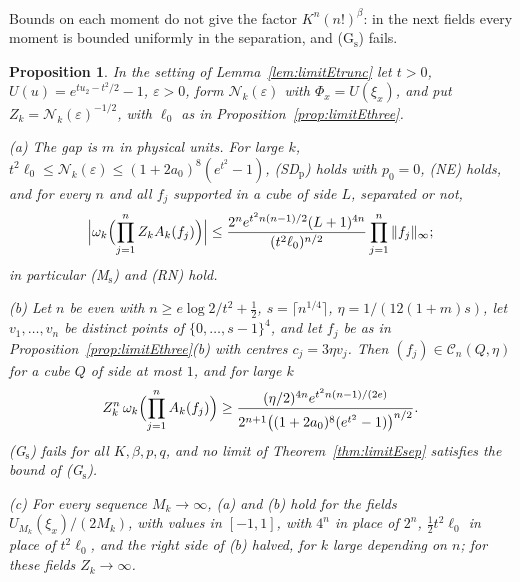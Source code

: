 \documentclass[aps,prd,twocolumn,superscriptaddress,nofootinbib,longbibliography,floatfix,amsmath,amssymb,10pt]{revtex4-2}
\newtheorem{proposition}[theorem]{Proposition}
\theoremstyle{definition}
\theoremstyle{remark}
\begin{document}
Bounds on each moment do not give the factor $K^n(n!)^\beta$: in the next
fields every moment is bounded uniformly in the separation, and
(G$_{\mathrm s}$) fails.

\begin{proposition}\label{prop:limitEfactorial}
In the setting of Lemma~\textup{\ref{lem:limitEtrunc}} let $t>0$,
$U(u)=e^{tu_2-t^2/2}-1$, $\varepsilon>0$, form $\mathcal N_k(\varepsilon)$
with $\Phi_x=U(\xi_x)$, and put $Z_k=\mathcal N_k(\varepsilon)^{-1/2}$, with
$\ell_0$ as in Proposition~\textup{\ref{prop:limitEthree}}.

\textup{(a)} The gap is $m$ in physical units. For large $k$, $t^2\ell_0\le
\mathcal N_k(\varepsilon)\le(1+2a_0)^8(e^{t^2}-1)$, \textup{(SD$_{\mathrm
p}$)} holds with $p_0=0$, \textup{(NE)} holds, and for every $n$ and all
$f_j$ supported in a cube of side $L$, separated or not,
\[
\Bigl|\omega_k\Bigl(\prod_{j=1}^nZ_kA_k(f_j)\Bigr)\Bigr|\le
\frac{2^ne^{t^2n(n-1)/2}(L+1)^{4n}}{(t^2\ell_0)^{n/2}}\prod_{j=1}^n\|f_j\|
_\infty ;
\]
in particular \textup{(M$_{\mathrm s}$)} and \textup{(RN)} hold.

\textup{(b)} Let $n$ be even with $n\ge e\log2/t^2+\frac12$, $s=\lceil
n^{1/4}\rceil$, $\eta=1/(12(1+m)s)$, let $v_1,\dots,v_n$ be distinct points of
$\{0,\dots,s-1\}^4$, and let $f_j$ be as in
Proposition~\textup{\ref{prop:limitEthree}(b)} with centres $c_j=3\eta v_j$.
Then $(f_j)\in\mathcal C_n(Q,\eta)$ for a cube $Q$ of side at most $1$, and
for large $k$
\[
Z_k^n\,\omega_k\Bigl(\prod_{j=1}^nA_k(f_j)\Bigr)\ge\frac{(\eta/2)^{4n}
e^{t^2n(n-1)/(2e)}}{2^{n+1}\bigl((1+2a_0)^8(e^{t^2}-1)\bigr)^{n/2}} .
\]
\textup{(G$_{\mathrm s}$)} fails for all $K,\beta,p,q$, and no limit of
Theorem~\textup{\ref{thm:limitEsep}} satisfies the bound of
\textup{(G$_{\mathrm s}$)}.

\textup{(c)} For every sequence $M_k\to\infty$, \textup{(a)} and \textup{(b)}
hold for the fields $U_{M_k}(\xi_x)/(2M_k)$, with values in $[-1,1]$, with
$4^n$ in place of $2^n$, $\frac12t^2\ell_0$ in place of $t^2\ell_0$, and the
right side of \textup{(b)} halved, for $k$ large depending on $n$; for these
fields $Z_k\to\infty$.
\end{proposition}
\end{document}
